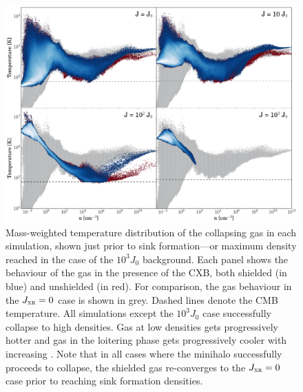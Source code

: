 \documentclass[../thesis.tex]{subfiles}
\begin{document}
\begin{figure}
  \begin{center}
    \includegraphics[width=\columnwidth]{figures/phase_diagrams/temp}
    \caption{Mass-weighted temperature distribution of the collapsing gas in each simulation, shown just prior to sink formation---or maximum density reached in the case of the $10^3 J_0$ background. Each panel shows the behaviour of the gas in the presence of the CXB, both shielded (in blue) and unshielded (in red). For comparison, the gas behaviour in the $J_{\textsc{xr}}=0$ case is shown in grey.  Dashed lines denote the CMB temperature. All simulations except the $10^3 J_0$ case successfully collapse to high densities.  Gas at low densities gets progressively hotter and gas in the loitering phase gets progressively cooler with increasing \jxr. Note that in all cases where the minihalo successfully proceeds to collapse, the shielded gas re-converges to the $J_{\textsc{xr}}=0$ case prior to reaching sink formation densities.}
    \label{Tdens}
  \end{center}
\end{figure}
\end{document}

